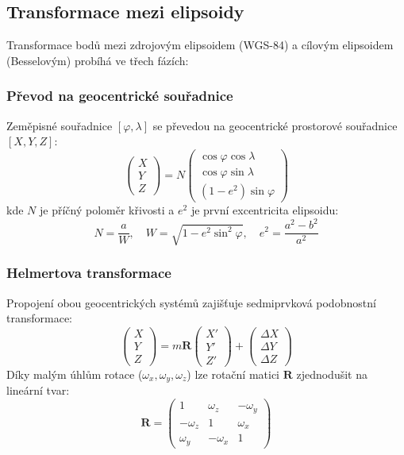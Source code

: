 \documentclass[12pt]{article}
\begin{document}
\subsection{Transformace mezi elipsoidy}
Transformace bodů mezi zdrojovým elipsoidem (WGS-84) a cílovým elipsoidem (Besselovým) probíhá ve třech fázích:

\subsubsection{Převod na geocentrické souřadnice}
Zeměpisné souřadnice $[\varphi, \lambda]$ se převedou na geocentrické prostorové souřadnice $[X, Y, Z]$:
\[
\begin{pmatrix} X \\ Y \\ Z \end{pmatrix} = N \begin{pmatrix} \cos \varphi \cos \lambda \\ \cos \varphi \sin \lambda \\ (1-e^2) \sin \varphi \end{pmatrix}
\]
kde $N$ je příčný poloměr křivosti a $e^2$ je první excentricita elipsoidu:
\[
N = \frac{a}{W}, \quad W = \sqrt{1 - e^2 \sin^2 \varphi}, \quad e^2 = \frac{a^2 - b^2}{a^2}
\]

\subsubsection{Helmertova transformace}
Propojení obou geocentrických systémů zajišťuje sedmiprvková podobnostní transformace:
\[
\begin{pmatrix} X \\ Y \\ Z \end{pmatrix} = m \mathbf{R} \begin{pmatrix} X' \\ Y' \\ Z' \end{pmatrix} + \begin{pmatrix} \Delta X \\ \Delta Y \\ \Delta Z \end{pmatrix}
\]
Díky malým úhlům rotace ($\omega_x, \omega_y, \omega_z$) lze rotační matici $\mathbf{R}$ zjednodušit na lineární tvar:
\[
\mathbf{R} = \begin{pmatrix} 1 & \omega_z & -\omega_y \\ -\omega_z & 1 & \omega_x \\ \omega_y & -\omega_x & 1 \end{pmatrix}
\]
\end{document}

